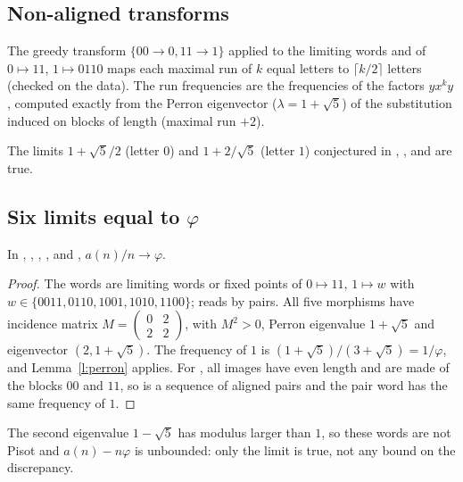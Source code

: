 \subsection{Non-aligned transforms}\label{s:runs}
The greedy transform $\{00\to0,11\to1\}$ applied to the limiting words  and  of
$0\mapsto11$, $1\mapsto0110$ maps each maximal run of $k$ equal letters to $\lceil k/2\rceil$ letters (checked on
the data). The run frequencies are the frequencies of the factors $yx^ky$, computed exactly from the Perron
eigenvector ($\lambda=1+\sqrt5$) of the substitution induced on blocks of length (maximal run $+2$).
\begin{theorem} The limits $1+\sqrt5/2$ (letter $0$) and $1+2/\sqrt5$ (letter $1$) conjectured in
, ,  and  are true.\end{theorem}

\subsection{Six limits equal to \texorpdfstring{$\varphi$}{phi}}\label{s:A285503}
\begin{theorem} In , , , ,  and
, $a(n)/n\to\varphi$.\end{theorem}
\begin{proof} The words are limiting words or fixed points of $0\mapsto11$, $1\mapsto w$ with
$w\in\{0011,0110,1001,1010,1100\}$;  reads  by pairs. All five morphisms have
incidence matrix $M=\begin{pmatrix}0&2\\2&2\end{pmatrix}$, with $M^2>0$, Perron eigenvalue $1+\sqrt5$ and
eigenvector $(2,1+\sqrt5)$. The frequency of $1$ is $(1+\sqrt5)/(3+\sqrt5)=1/\varphi$, and
Lemma~\ref{l:perron} applies. For , all images have even length and are made of the blocks $00$
and $11$, so  is a sequence of aligned pairs and the pair word has the same frequency of
$1$. \end{proof}
The second eigenvalue $1-\sqrt5$ has modulus larger than $1$, so these words are not Pisot and
$a(n)-n\varphi$ is unbounded: only the limit is true, not any bound on the discrepancy.
